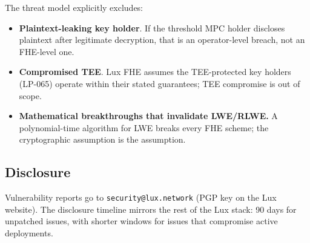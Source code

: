 The threat model explicitly excludes:

\begin{itemize}
\item \textbf{Plaintext-leaking key holder}. If the threshold MPC
holder discloses plaintext after legitimate decryption, that is an
operator-level breach, not an FHE-level one.
\item \textbf{Compromised TEE}. Lux FHE assumes the TEE-protected
key holders (LP-065) operate within their stated guarantees;
TEE compromise is out of scope.
\item \textbf{Mathematical breakthroughs that invalidate LWE/RLWE.}
A polynomial-time algorithm for LWE breaks every FHE scheme; the
cryptographic assumption is the assumption.
\end{itemize}

\subsection{Disclosure}

Vulnerability reports go to \texttt{security@lux.network} (PGP key
on the Lux website). The disclosure timeline mirrors the rest of
the Lux stack: 90 days for unpatched issues, with shorter windows
for issues that compromise active deployments.
